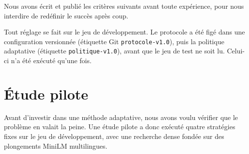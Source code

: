 \documentclass[11pt,a4paper]{article}
\begin{document}
Nous avons écrit et publié les critères suivants avant toute expérience, pour nous interdire de
redéfinir le succès après coup.

\begin{center}
\end{center}

Tout réglage se fait sur le jeu de développement. Le protocole a été figé dans une configuration
versionnée (étiquette Git \texttt{protocole-v1.0}), puis la politique adaptative (étiquette
\texttt{politique-v1.0}), avant que le jeu de test ne soit lu. Celui-ci n'a été exécuté qu'une fois.

\section{Étude pilote}\label{sec:pilote}

Avant d'investir dans une méthode adaptative, nous avons voulu vérifier que le problème en valait la
peine. Une étude pilote a donc exécuté quatre stratégies fixes sur le jeu de développement, avec une
recherche dense fondée sur des plongements MiniLM multilingues.
\end{document}
